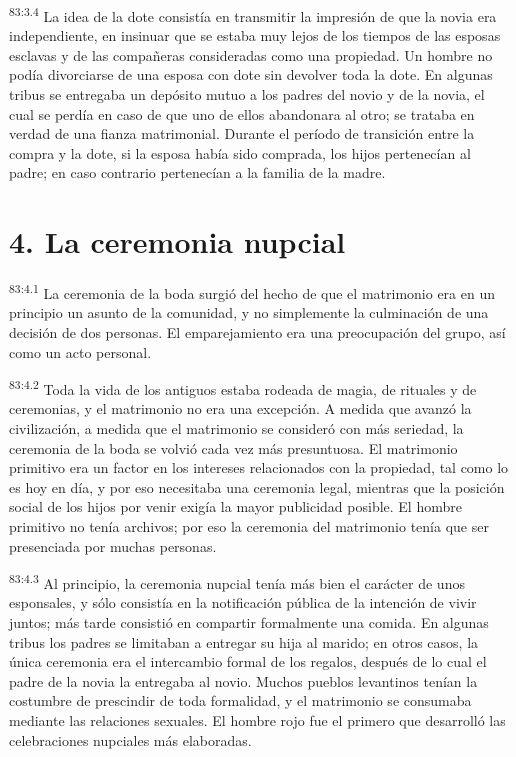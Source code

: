 \par
\textsuperscript{83:3.4} La idea de la dote consistía en transmitir la impresión de que la novia era independiente, en insinuar que se estaba muy lejos de los tiempos de las esposas esclavas y de las compañeras consideradas como una propiedad. Un hombre no podía divorciarse de una esposa con dote sin devolver toda la dote. En algunas tribus se entregaba un depósito mutuo a los padres del novio y de la novia, el cual se perdía en caso de que uno de ellos abandonara al otro; se trataba en verdad de una fianza matrimonial. Durante el período de transición entre la compra y la dote, si la esposa había sido comprada, los hijos pertenecían al padre; en caso contrario pertenecían a la familia de la madre.

\section*{4. La ceremonia nupcial}
\par
\textsuperscript{83:4.1} La ceremonia de la boda surgió del hecho de que el matrimonio era en un principio un asunto de la comunidad, y no simplemente la culminación de una decisión de dos personas. El emparejamiento era una preocupación del grupo, así como un acto personal.

\par
\textsuperscript{83:4.2} Toda la vida de los antiguos estaba rodeada de magia, de rituales y de ceremonias, y el matrimonio no era una excepción. A medida que avanzó la civilización, a medida que el matrimonio se consideró con más seriedad, la ceremonia de la boda se volvió cada vez más presuntuosa. El matrimonio primitivo era un factor en los intereses relacionados con la propiedad, tal como lo es hoy en día, y por eso necesitaba una ceremonia legal, mientras que la posición social de los hijos por venir exigía la mayor publicidad posible. El hombre primitivo no tenía archivos; por eso la ceremonia del matrimonio tenía que ser presenciada por muchas personas.

\par
\textsuperscript{83:4.3} Al principio, la ceremonia nupcial tenía más bien el carácter de unos esponsales, y sólo consistía en la notificación pública de la intención de vivir juntos; más tarde consistió en compartir formalmente una comida. En algunas tribus los padres se limitaban a entregar su hija al marido; en otros casos, la única ceremonia era el intercambio formal de los regalos, después de lo cual el padre de la novia la entregaba al novio. Muchos pueblos levantinos tenían la costumbre de prescindir de toda formalidad, y el matrimonio se consumaba mediante las relaciones sexuales. El hombre rojo fue el primero que desarrolló las celebraciones nupciales más elaboradas.


